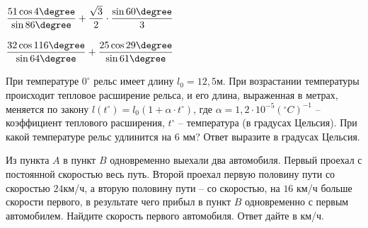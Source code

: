 \begin{class}[number=2]
\begin{listofex}
		\begin{enumcols}[itemcolumns=2]
			\item \( \dfrac{51\cos 4\degree}{\sin 86\degree}+\dfrac{\sqrt{3}}{2}\cdot\dfrac{\sin 60\degree}{3} \)
			\item \( \dfrac{32\cos116\degree}{\sin 64\degree}+\dfrac{25\cos 29\degree}{\sin 61\degree} \)
		\end{enumcols}
		\item При температуре \( 0^{\circ}  \) рельс имеет длину \( l_0=12,5 \)м. При возрастании температуры происходит тепловое расширение рельса, и его длина, выраженная в метрах, меняется по закону \( l(t^{\circ})=l_0(1+\alpha\cdot t^{\circ}) \), где  \( \alpha=1,2\cdot 10^{-5}(^{\circ}C)^{-1} \) – коэффициент теплового расширения, \( t^{\circ} \) – температура (в градусах Цельсия). При какой температуре рельс удлинится на \( 6 \) мм? Ответ выразите в градусах Цельсия.
		\item  Из пункта \( A \) в пункт \( B \) одновременно выехали два автомобиля. Первый проехал с постоянной скоростью весь путь. Второй проехал первую половину пути со скоростью \( 24 \)км/ч, а вторую половину пути – со скоростью, на \(16\) км/ч больше скорости первого, в результате чего прибыл в пункт \( B \) одновременно с первым автомобилем. Найдите скорость первого автомобиля. Ответ дайте в км/ч.
	\end{listofex}
\end{class}
\newpage
